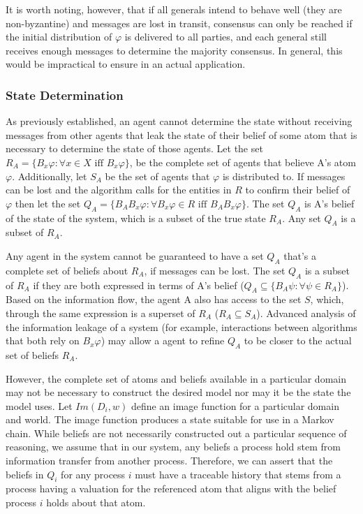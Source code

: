 It is worth noting, however, that if all generals intend to behave well (they are non-byzantine) and messages are lost in transit, consensus can only be reached if the initial distribution of $\varphi$ is delivered to all parties, and each general still receives enough messages to determine the majority consensus. In general, this would be impractical to ensure in an actual application.

\subsubsection{State Determination}

As previously established, an agent cannot determine the state without receiving messages from other agents that leak the state of their belief of some atom that is necessary to determine the state of those agents. Let the set $R_A = \{ B_x \varphi : \forall x \in X \text{ iff } B_x \varphi \}$, be the complete set of agents that believe A's atom $\varphi$. Additionally, let $S_A$ be the set of agents that $\varphi$ is distributed to. If messages can be lost and the algorithm calls for the entities in $R$ to confirm their belief of $\varphi$ then let the set $Q_A = \{ B_A B_x \varphi : \forall B_x \varphi \in R \text{ iff } B_A B_x \varphi \}$. The set $Q_A$ is A's belief of the state of the system, which is a subset of the true state $R_A$. Any set $Q_A$ is a subset of $R_A$.

Any agent in the system cannot be guaranteed to have a set $Q_A$ that's a complete set of beliefs about $R_A$, if messages can be lost. The set $Q_A$ is a subset of $R_A$ if they are both expressed in terms of A's belief ($Q_A \subseteq \{ B_A \psi : \forall \psi \in R_A \}$). Based on the information flow, the agent A also has access to the set $S$, which, through the same expression is a superset of $R_A$ ($R_A \subseteq S_A$). Advanced analysis of the information leakage of a system (for example, interactions between algorithms that both rely on $B_x \varphi$) may allow a agent to refine $Q_A$ to be closer to the actual set of beliefs $R_A$.

However, the complete set of atoms and beliefs available in a particular domain may not be necessary to construct the desired model nor may it be the state the model uses. Let $Im(D_i, w)$ define an image function for a particular domain and world. The image function produces a state suitable for use in a Markov chain. While beliefs are not necessarily constructed out a particular sequence of reasoning, we assume that in our system, any beliefs a process hold stem from information transfer from another process. Therefore, we can assert that the beliefs in $Q_i$ for any process $i$ must have a traceable history that stems from a process having a valuation for the referenced atom that aligns with the belief process $i$ holds about that atom.

